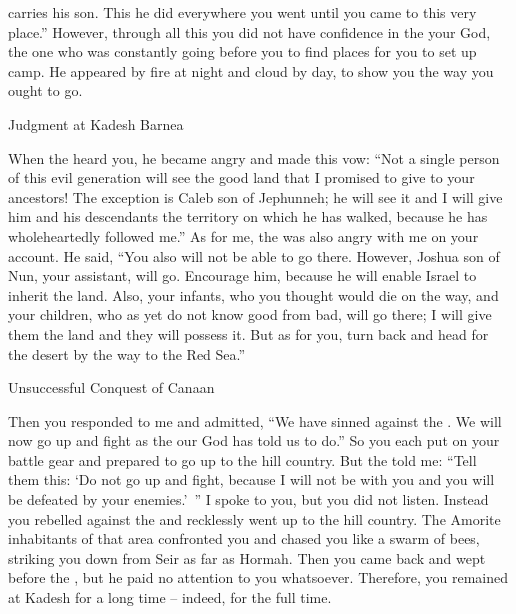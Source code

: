 {carries
his son.
This he did
everywhere
you went
until
you came
to
this
very
place.”
However, through all this
you did not
have confidence
in the
{}
your God,
the one who was constantly
going
before
you to find places
for you to set up camp.
He appeared
by fire
at night
and cloud
by day,
to show
you the way
you ought to go.
\par }{\SH Judgment at Kadesh Barnea
\par }{\PP {}When
the {}
heard
you, he became
angry
and made this vow:
“Not a single
person
of this
evil
generation
will see
the good
land
that
I promised
to give
to your ancestors!
The exception
is Caleb
son
of Jephunneh;
he
will see
it and I will give
him and his descendants
the territory
on which
he has
walked,
because
he has
wholeheartedly
followed me.”
As for me, the
{}
was also
angry
with me on your account.
He said,
“You
also
will not
be able to go
there.
However, Joshua
son
of Nun,
your assistant,
will go.
Encourage
him, because
he will enable Israel
to inherit the land.
Also, your infants,
who
you thought
would die on the way,
and your children,
who
as yet
do not
know
good
from bad,
will go
there;
I will give
them the land and they
will possess it.
But as for you,
turn
back and head
for the desert
by the way
to the Red
Sea.”
\par }{\SH Unsuccessful Conquest of Canaan
\par }{\PP {}Then you responded
to me
and admitted,
“We have sinned
against the
{}. We
will now go up
and fight
as
the {}
our God
has told
us to do.” So you each
put on your
battle
gear
and prepared to go up
to the hill country.
But the
{}
told me: “Tell
them this: ‘Do not
go up
and fight,
because
I will not
be with you and you will be defeated
by your enemies.’ ”
I spoke
to
you, but you did not
listen.
Instead you rebelled
against the
{}
and recklessly
went up
to the hill country.
The Amorite
inhabitants
of that
area
confronted
you and chased
you like a swarm
of bees,
striking
you down from Seir
as far
as Hormah.
Then you came back
and wept
before
the {}, but he
paid
no
attention
to you whatsoever.
Therefore, you remained
at Kadesh
for a long
time
– indeed, for the full
time.

}
